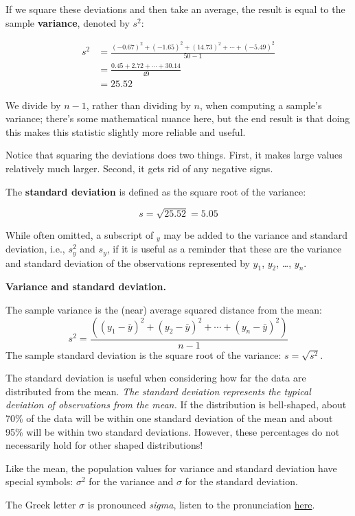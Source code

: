 \documentclass[
  10pt,
  openany]{book}
\theoremstyle{definition}
\theoremstyle{definition}
\theoremstyle{definition}
\theoremstyle{definition}
\theoremstyle{remark}
\begin{document}
If we square these deviations and then take an average, the result is equal to the sample \textbf{variance}, denoted by \(s^2\):

\begin{align*}
s^2 &= \frac{(-0.67)^2 + (-1.65)^2 + (14.73)^2 + \cdots + (-5.49)^2}{50 - 1} \\
&= \frac{0.45 + 2.72 + \cdots + 30.14}{49} \\
&= 25.52
\end{align*}

We divide by \(n - 1\), rather than dividing by \(n\), when computing a sample's variance; there's some mathematical nuance here, but the end result is that doing this makes this statistic slightly more reliable and useful.

Notice that squaring the deviations does two things. First, it makes large values relatively much larger. Second, it gets rid of any negative signs.

The \textbf{standard deviation} is defined as the square root of the variance:

\[ s = \sqrt{25.52} = 5.05 \]

While often omitted, a subscript of \(_y\) may be added to the variance and standard deviation, i.e., \(s_y^2\) and \(s_y\), if it is useful as a reminder that these are the variance and standard deviation of the observations represented by \(y_1\), \(y_2\), \ldots, \(y_n\).

\textbf{Variance and standard deviation.}

The sample variance is the (near) average squared distance from the mean:
\[
  s^2 = \frac{((y_1 - \bar{y})^2 + (y_2 - \bar{y})^2 + \cdots + (y_n - \bar{y})^2)}{n-1}
\]
The sample standard deviation is the square root of the variance: \(s = \sqrt{s^2}\).

The standard deviation is useful when considering how far the data are distributed from the mean.
\emph{The standard deviation represents the typical deviation of observations from the mean.}
If the distribution is bell-shaped, about 70\% of the data will be within one standard deviation of the mean and about 95\% will be within two standard deviations.
However, these percentages do not necessarily hold for other shaped distributions!

Like the mean, the population values for variance and standard deviation have special symbols: \(\sigma^2\) for the variance and \(\sigma\) for the standard deviation.

The Greek letter \(\sigma\) is pronounced \emph{sigma}, listen to the pronunciation \href{https://youtu.be/PStgY5AcEIw?t=72}{here}.
\end{document}
